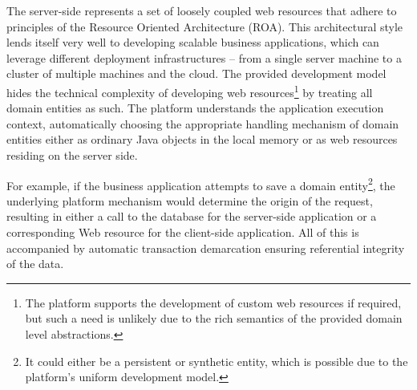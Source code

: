   The server-side represents a set of loosely coupled web resources that adhere to principles of the Resource Oriented Architecture (ROA).
  This architectural style lends itself very well to developing scalable business applications, which can leverage different deployment infrastructures -- from a single server machine to a cluster of multiple machines and the cloud.
  The provided development model hides the technical complexity of developing web resources\footnote{The platform supports the development of custom web resources if required, but such a need is unlikely due to the rich semantics of the provided domain level abstractions.} by treating all domain entities as such.
  The platform understands the application execution context, automatically choosing the appropriate handling mechanism of domain entities either as ordinary Java objects in the local memory or as web resources residing on the server side.
  
  For example, if the business application attempts to save a domain entity\footnote{It could either be a persistent or synthetic entity, which is possible due to the platform's uniform development model.}, the underlying platform mechanism would determine the origin of the request, resulting in either a call to the database for the server-side application or a corresponding Web resource for the client-side application.
  All of this is accompanied by automatic transaction demarcation ensuring referential integrity of the data.

